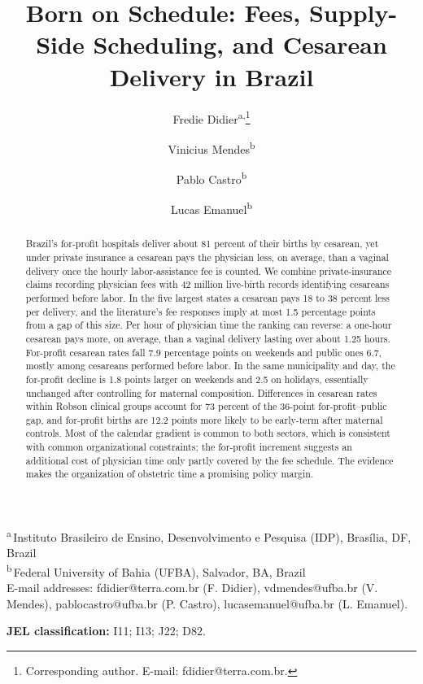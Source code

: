 \documentclass[12pt]{article}
\title{Born on Schedule: Fees, Supply-Side Scheduling, and Cesarean Delivery
in Brazil}
\author{Fredie Didier\textsuperscript{a,}\thanks{Corresponding author.
E-mail: fdidier@terra.com.br.}
\and Vinicius Mendes\textsuperscript{b}
\and Pablo Castro\textsuperscript{b}
\and Lucas Emanuel\textsuperscript{b}}
\date{}
\begin{document}
\maketitle

\vspace{-1.5em}
\begin{center}\small
\textsuperscript{a}\,Instituto Brasileiro de Ensino, Desenvolvimento e Pesquisa
(IDP), Bras\'ilia, DF, Brazil\\
\textsuperscript{b}\,Federal University of Bahia (UFBA), Salvador, BA, Brazil\\[2pt]
E-mail addresses: fdidier@terra.com.br (F. Didier), vdmendes@ufba.br
(V. Mendes), pablocastro@ufba.br (P. Castro), lucasemanuel@ufba.br (L. Emanuel).
\end{center}

\begin{abstract}
\noindent Brazil's for-profit hospitals deliver about 81 percent of their births by cesarean, yet under private insurance a cesarean pays the physician less, on average, than a vaginal delivery once the hourly labor-assistance fee is counted. We combine private-insurance claims recording physician fees with 42 million live-birth records identifying cesareans performed before labor. In the five largest states a cesarean pays 18 to 38 percent less per delivery, and the literature's fee responses imply at most 1.5 percentage points from a gap of this size. Per hour of physician time the ranking can reverse: a one-hour cesarean pays more, on average, than a vaginal delivery lasting over about 1.25 hours. For-profit cesarean rates fall 7.9 percentage points on weekends and public ones 6.7, mostly among cesareans performed before labor. In the same municipality and day, the for-profit decline is 1.8 points larger on weekends and 2.5 on holidays, essentially unchanged after controlling for maternal composition. Differences in cesarean rates within Robson clinical groups account for 73 percent of the 36-point for-profit–public gap, and for-profit births are 12.2 points more likely to be early-term after maternal controls. Most of the calendar gradient is common to both sectors, which is consistent with common organizational constraints; the for-profit increment suggests an additional cost of physician time only partly covered by the fee schedule. The evidence makes the organization of obstetric time a promising policy margin.
\end{abstract}

\bigskip
\noindent \textbf{JEL classification:} I11; I13; J22; D82.
\end{document}
